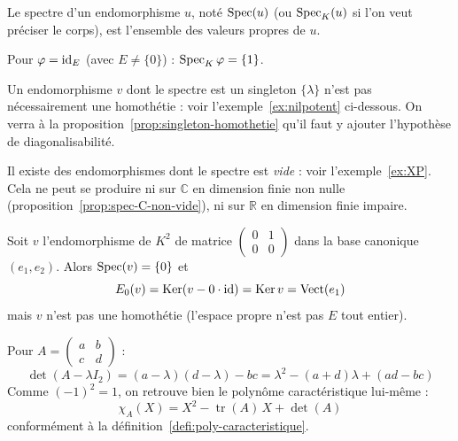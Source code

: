 \begin{defi}[Spectre]
Le spectre d'un endomorphisme $u$, noté $\operatorname{Spec}(u)$ (ou $\operatorname{Spec}_K(u)$ si l'on veut préciser le corps), est l'ensemble des valeurs propres de $u$.
\end{defi}

\begin{exemple}
Pour $\varphi=\operatorname{id}_E$ (avec $E\neq\{0\}$) : $\operatorname{Spec}_K \varphi = \{1\}$.
\end{exemple}

\begin{remarque}
Un endomorphisme $v$ dont le spectre est un singleton $\{\lambda\}$ n'est pas nécessairement une homothétie : voir l'exemple~\ref{ex:nilpotent} ci-dessous. On verra à la proposition~\ref{prop:singleton-homothetie} qu'il faut y ajouter l'hypothèse de diagonalisabilité.
\end{remarque}

\begin{remarque}
Il existe des endomorphismes dont le spectre est \emph{vide} : voir l'exemple~\ref{ex:XP}. Cela ne peut se produire ni sur $\mathbb{C}$ en dimension finie non nulle (proposition~\ref{prop:spec-C-non-vide}), ni sur $\mathbb{R}$ en dimension finie impaire.
\end{remarque}

\begin{exemple}
\label{ex:nilpotent}
Soit $v$ l'endomorphisme de $K^2$ de matrice $\begin{pmatrix} 0 & 1 \\ 0 & 0 \end{pmatrix}$ dans la base canonique $(e_1,e_2)$. Alors $\operatorname{Spec}(v)=\{0\}$ et
\[E_0(v) = \operatorname{Ker}(v-0\cdot\operatorname{id}) = \operatorname{Ker} v = \operatorname{Vect}(e_1)\]
mais $v$ n'est pas une homothétie (l'espace propre n'est pas $E$ tout entier).
\end{exemple}

\begin{exemple}
Pour $A=\begin{pmatrix} a & b \\ c & d\end{pmatrix}$ :
\[\det(A-\lambda I_2) = (a-\lambda)(d-\lambda)-bc = \lambda^2-(a+d)\lambda+(ad-bc)\]
Comme $(-1)^2=1$, on retrouve bien le polynôme caractéristique lui-même :
\[\chi_A(X) = X^2 - \operatorname{tr}(A)\,X + \det(A)\]
conformément à la définition~\ref{defi:poly-caracteristique}.
\end{exemple}

